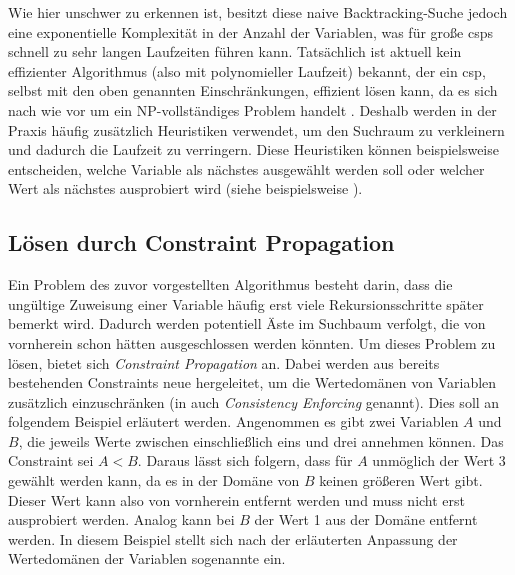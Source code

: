 Wie hier unschwer zu erkennen ist, besitzt diese naive Backtracking-Suche jedoch eine exponentielle Komplexität in der Anzahl der Variablen, was für große \acp*{csp} schnell zu
sehr langen Laufzeiten führen kann. Tatsächlich ist aktuell kein effizienter Algorithmus (also mit polynomieller Laufzeit) bekannt, der ein \ac*{csp}, selbst mit den oben genannten
Einschränkungen, effizient lösen kann, da es sich nach wie vor um ein NP-vollständiges Problem handelt \cite{BestCSPSearch}. Deshalb werden in der Praxis häufig zusätzlich
Heuristiken verwendet, um den Suchraum zu verkleinern und dadurch die Laufzeit zu verringern. Diese Heuristiken können beispielsweise entscheiden, welche Variable als nächstes
ausgewählt werden soll oder welcher Wert als nächstes ausprobiert wird (siehe beispielsweise \cite{OrderingHeuristics}).

\subsection{Lösen durch Constraint Propagation}
\label{sec:ConstrProp}
Ein Problem des zuvor vorgestellten Algorithmus besteht darin, dass die ungültige Zuweisung einer Variable häufig erst viele Rekursionsschritte später bemerkt wird. Dadurch werden
potentiell Äste im Suchbaum verfolgt, die von vornherein schon hätten ausgeschlossen werden könnten. Um dieses Problem zu lösen, bietet sich \textit{Constraint Propagation}
an. Dabei werden aus bereits bestehenden Constraints neue hergeleitet, um die Wertedomänen von Variablen zusätzlich einzuschränken (in \cite{OrderingHeuristics} auch
\textit{Consistency Enforcing} genannt). Dies soll an folgendem Beispiel erläutert werden. Angenommen es gibt zwei Variablen $A$ und $B$, die jeweils Werte zwischen einschließlich
eins und drei annehmen können. Das Constraint sei $A < B$. Daraus lässt sich folgern, dass für $A$ unmöglich der Wert 3 gewählt werden kann, da es in der Domäne von $B$ keinen
größeren Wert gibt. Dieser Wert kann also von vornherein entfernt werden und muss nicht erst ausprobiert werden. Analog kann bei $B$ der Wert 1 aus der Domäne entfernt werden.
In diesem Beispiel stellt sich nach der erläuterten Anpassung der Wertedomänen der Variablen sogenannte  ein. 

